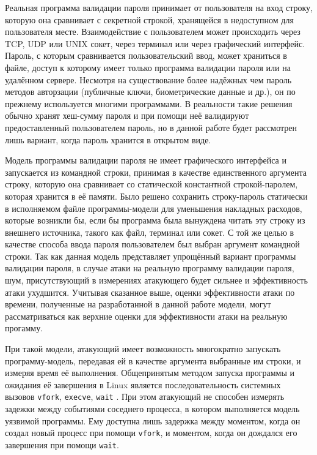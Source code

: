 Реальная программа валидации пароля принимает от пользователя на вход строку,
которую она сравнивает с секретной строкой, хранящейся в недоступном для
пользователя месте. Взаимодействие с пользователем может происходить через
TCP, UDP или UNIX сокет, через терминал или через графический интерфейс.
Пароль, с которым сравнивается пользовательский ввод, может храниться в файле,
доступ к которому имеет только программа валидации пароля или на удалённом
сервере. Несмотря на существование более надёжных чем пароль методов авторзации
(публичные ключи, биометрические данные и др.), он по прежнему используется
многими программами. В реальности такие решения обычно хранят хеш-сумму пароля и
при помощи неё валидируют предоставленный пользователем пароль, но в данной работе
будет рассмотрен лишь вариант, когда пароль хранится в открытом виде.

Модель программы валидации пароля не имеет графического интерфейса и запускается
из командной строки, принимая в качестве единственного аргумента строку, которую
она сравнивает со статической константной строкой-паролем, которая хранится в
её памяти. Было решено сохранить строку-пароль статически в исполняемом файле
программы-модели для уменьшения накладных расходов, которые возникли
бы, если бы программа была вынуждена читать эту строку из внешнего источника,
такого как файл, терминал или сокет. С той же целью в качестве способа ввода
пароля пользователем был выбран аргумент командной строки. Так как данная модель
представляет упрощённый вариант программы валидации пароля, в случае атаки на
реальную программу валидации пароля, шум, присутствующий в измерениях атакующего
будет сильнее и эффективность атаки ухудшится. Учитывая сказанное выше,
оценки эффективности атаки по времени, полученные на разработанной в данной
работе модели, могут рассматриваться как верхние оценки для эффективности атаки
на реальную прогамму.

При такой модели, атакующий имеет возможность многократно запускать
программу-модель, передавая ей в качестве аргумента выбранные им строки, и
измеряя время её выполнения. Общепринятым методом запуска программы
и ожидания её завершения в Linux является последовательность системных вызовов
\texttt{vfork}, \texttt{execve}, \texttt{wait} \cite{kerrisk}. При этом
атакующий не способен измерять задежки между событиями соседнего процесса, в
котором выполняется модель уязвимой программы. Ему доступна лишь задержка между
моментом, когда он создал новый процесс при помощи \texttt{vfork}, и моментом,
когда он дождался его завершения при помощи \texttt{wait}.

